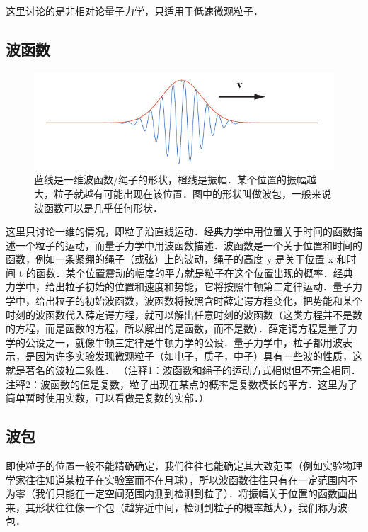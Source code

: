 
这里讨论的是非相对论量子力学，只适用于低速微观粒子．

\subsection{波函数}

\begin{figure}[ht]
\centering
\includegraphics[width=12cm]{./figures/QM01.pdf}
\caption{蓝线是一维波函数/绳子的形状，橙线是振幅．某个位置的振幅越大，粒子就越有可能出现在该位置．图中的形状叫做波包，一般来说波函数可以是几乎任何形状．} \label{QM0_fig1}
\end{figure}

这里只讨论一维的情况，即粒子沿直线运动．经典力学中用位置关于时间的函数描述一个粒子的运动，而量子力学中用波函数描述．波函数是一个关于位置和时间的函数，例如一条紧绷的绳子（或弦）上的波动，绳子的高度 y 是关于位置 x 和时间 t 的函数．某个位置震动的幅度的平方就是粒子在这个位置出现的概率．经典力学中，给出粒子初始的位置和速度和势能，它将按照牛顿第二定律运动．量子力学中，给出粒子的初始波函数，波函数将按照含时薛定谔方程变化，把势能和某个时刻的波函数代入薛定谔方程，就可以解出任意时刻的波函数（这类方程并不是数的方程，而是函数的方程，所以解出的是函数，而不是数）．薛定谔方程是量子力学的公设之一，就像牛顿三定律是牛顿力学的公设．量子力学中，粒子都用波表示，是因为许多实验发现微观粒子（如电子，质子，中子）具有一些波的性质，这就是著名的波粒二象性．
（注释1：波函数和绳子的运动方式相似但不完全相同．注释2：波函数的值是复数，粒子出现在某点的概率是复数模长的平方．这里为了简单暂时使用实数，可以看做是复数的实部．）

\subsection{波包}
即使粒子的位置一般不能精确确定，我们往往也能确定其大致范围（例如实验物理学家往往知道某粒子在实验室而不在月球），所以波函数往往只有在一定范围内不为零（我们只能在一定空间范围内测到检测到粒子）．将振幅关于位置的函数画出来，其形状往往像一个包（越靠近中间，检测到粒子的概率越大），我们称为波包．

